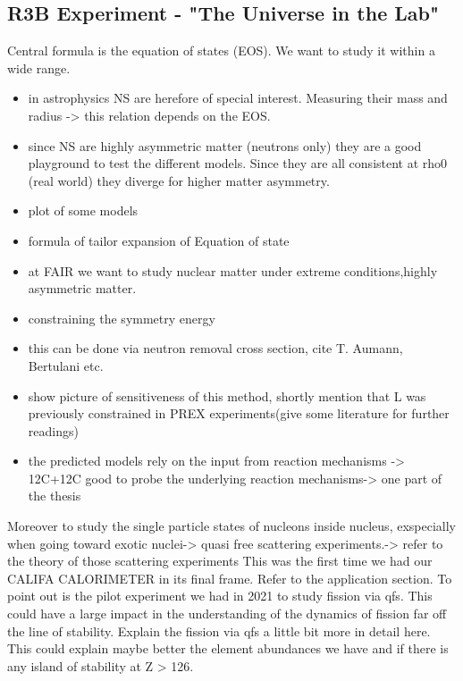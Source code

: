 \subsection{R3B Experiment - "The Universe in the Lab"}
Central formula is the equation of states (EOS). We want to study it within a wide range. 
\begin{itemize}
\item in astrophysics NS are herefore of special interest. Measuring their mass and radius -> this relation depends on the EOS. 
\item since NS are highly asymmetric matter (neutrons only) they are a good playground to test the different models. Since they are all consistent at rho0 (real world) they diverge for higher matter asymmetry. 
\item plot of some models
\item formula of tailor expansion of Equation of state
\item at FAIR we want to study  nuclear matter under extreme conditions,highly asymmetric matter. 
\item constraining the symmetry energy
\item this can be done via neutron removal cross section, cite T. Aumann, Bertulani etc.
\item show picture of sensitiveness of this method, shortly mention that L was previously constrained in PREX experiments(give some literature for further readings)
\item the predicted models rely on the input from reaction mechanisms -> 12C+12C good to probe the underlying reaction mechanisms-> one part of the thesis
\end{itemize}
Moreover to study the single particle states of nucleons inside nucleus, exspecially when going toward exotic nuclei-> quasi free scattering experiments.-> refer to the theory of those scattering experiments
This was the first time we had our CALIFA CALORIMETER in its final frame. 
Refer to the application section. \newline
To point out is the pilot experiment we had in 2021 to study fission via qfs. This could have a large impact in the understanding of the dynamics of fission far off the line of stability. \newline
Explain the fission via qfs a little bit more in detail here.\newline
This could explain maybe better the element abundances we have and if there is any island of stability at Z > 126.

